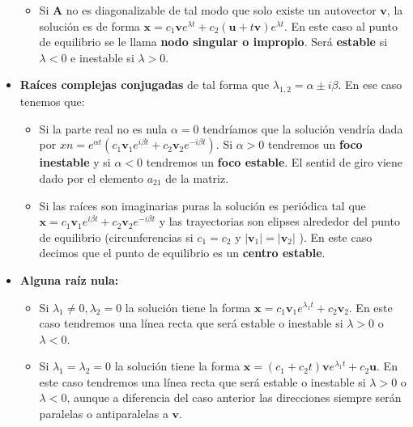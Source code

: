 \documentclass[12pt,a4paper]{article}
\numberwithin{equation}{section}
\numberwithin{figure}{section}
\newcommand{\vn}{\mathbf{v}}
\newcommand{\xn}{\mathbf{x}}
\newcommand{\An}{\mathbf{A}}
\newcommand{\un}{\mathbf{u}}
\begin{document}
\begin{itemize}
\begin{itemize}
\item Si $\An$ no es diagonalizable de tal modo que solo existe un autovector $\vn$, la solución es de forma $\xn = c_1 \vn e^{\lambda t} + c_2 (\un + t \vn) e^{\lambda t}$. En este caso al punto de equilibrio se le llama \textbf{nodo singular o impropio}. Será \textbf{estable} si $\lambda<0$ e inestable si $\lambda>0$.
\end{itemize}

\item \textbf{Raíces complejas conjugadas} de tal forma que $\lambda_{1,2} = \alpha \pm i \beta$. En ese caso tenemos que:

\begin{itemize}
\item Si la parte real no es nula $\alpha = 0$ tendríamos que la solución vendría dada por $xn = e^{\alpha t} (c_1 \vn_1 e^{i \beta t} + c_2 \vn_2 e^{-i \beta t})$. Si $\alpha > 0$ tendremos un \textbf{foco inestable} y si $\alpha < 0$ tendremos un \textbf{foco estable}. El sentid de giro viene dado por el elemento $a_{21}$ de la matriz.

\item Si las raíces son imaginarias puras la solución es periódica tal que $\xn = c_1 \vn_1 e^{i \beta t} + c_2 \vn_2 e^{-i \beta t}$ y las trayectorias son elipses alrededor del punto de equilibrio (circunferencias si $c_1 = c_2$ y $|\vn_1|=|\vn_2|$ ).  En este caso decimos que el punto de equilibrio es un \textbf{centro estable}.

\end{itemize}

\item \textbf{Alguna raíz nula:}

\begin{itemize}
\item Si $\lambda_1 \neq 0, \lambda_2 = 0$ la solución tiene la forma $\xn = c_1 \vn_1 e^{\lambda_1 t} + c_2 \vn_2$. En este caso tendremos una línea recta que será estable o inestable si $\lambda>0$ o $\lambda<0$.
\item Si $\lambda_1 = \lambda_2 = 0$ la solución tiene la forma $\xn = (c_1+c_2 t) \vn e^{\lambda_1 t} + c_2 \un$. En este caso tendremos una línea recta que será estable o inestable si $\lambda>0$ o $\lambda<0$, aunque a diferencia del caso anterior las direcciones siempre serán paralelas o antiparalelas a $\vn$.
\end{itemize}

\end{itemize}
\end{document}
